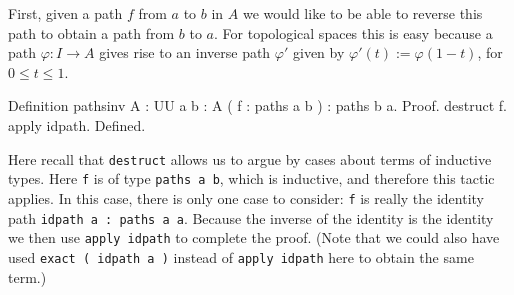 First, given a path $f$ from $a$ to $b$ in $A$ we would like to be
able to reverse this path to obtain a path from $b$ to $a$.  For
topological spaces this is easy because a path $\varphi:I\to A$ gives
rise to an inverse path $\varphi'$ given by
$\varphi'(t):=\varphi(1-t)$, for $0\leq t\leq 1$.
\begin{center}
  \begin{coqcode}
Definition pathsinv { A : UU } { a b : A } ( f : paths a b ) 
: paths b a.
Proof.
  destruct f. apply idpath. 
Defined.
  \end{coqcode}
\end{center}
Here recall that \verb|destruct| allows us to argue by cases
about terms of inductive types.  Here \verb|f| is of type
\verb|paths a b|, which is inductive, and therefore this tactic
applies.  In this case, there is only one case to consider:
\verb|f| is really the identity path 
\verb|idpath a : paths a a|.  Because the inverse of the identity is the identity we then use
\verb|apply idpath| to complete the proof.  (Note that we could
also have used \verb|exact ( idpath a )| instead of
\verb|apply idpath| here to obtain the same term.)

